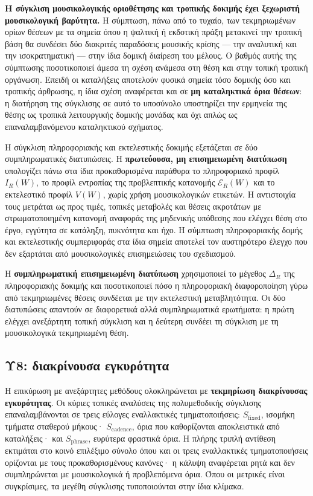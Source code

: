 \documentclass[11pt,a4paper]{article}
\begin{document}
\textbf{Η σύγκλιση μουσικολογικής οριοθέτησης και τροπικής δοκιμής έχει ξεχωριστή μουσικολογική βαρύτητα.} Η σύμπτωση, πάνω από το τυχαίο, των τεκμηριωμένων ορίων θέσεων με τα σημεία όπου η ψαλτική ή εκδοτική πράξη μετακινεί την τροπική βάση θα συνδέσει δύο διακριτές παραδόσεις μουσικής κρίσης --- την αναλυτική και την ισοκρατηματική --- στην ίδια δομική διαίρεση του μέλους. Ο βαθμός αυτής της σύμπτωσης ποσοτικοποιεί άμεσα τη σχέση ανάμεσα στη θέση και στην τοπική τροπική οργάνωση. Επειδή οι καταλήξεις αποτελούν φυσικά σημεία τόσο δομικής όσο και τροπικής άρθρωσης, η ίδια σχέση αναφέρεται και σε \textbf{μη καταληκτικά όρια θέσεων}: η διατήρηση της σύγκλισης σε αυτό το υποσύνολο υποστηρίζει την ερμηνεία της θέσης ως τροπικά λειτουργικής δομικής μονάδας και όχι απλώς ως επαναλαμβανόμενου καταληκτικού σχήματος.

Η σύγκλιση πληροφοριακής και εκτελεστικής δοκιμής εξετάζεται σε δύο συμπληρωματικές διατυπώσεις. Η \textbf{πρωτεύουσα, μη επισημειωμένη διατύπωση} υπολογίζει πάνω στα ίδια προκαθορισμένα παράθυρα το πληροφοριακό προφίλ \(I_R(W)\), το προφίλ εντροπίας της προβλεπτικής κατανομής \(\mathcal E_R(W)\) και το εκτελεστικό προφίλ \(V(W)\), χωρίς χρήση μουσικολογικών ετικετών. Η αντιστοιχία τους μετράται ως προς τιμές, τοπικές μεταβολές και θέσεις ακροτάτων με στρωματοποιημένη κατανομή αναφοράς της μηδενικής υπόθεσης που ελέγχει θέση στο έργο, εγγύτητα σε κατάληξη, πυκνότητα και ήχο. Η σύμπτωση πληροφοριακής δομής και εκτελεστικής συμπεριφοράς στα ίδια σημεία αποτελεί τον αυστηρότερο έλεγχο που δεν εξαρτάται από μουσικολογικές επισημειώσεις του σχεδιασμού.

Η \textbf{συμπληρωματική επισημειωμένη διατύπωση} χρησιμοποιεί το μέγεθος \(\Delta_R\) της πληροφοριακής δοκιμής και ποσοτικοποιεί πόσο η πληροφοριακή διαφοροποίηση γύρω από τεκμηριωμένες θέσεις συνδέεται με την εκτελεστική μεταβλητότητα. Οι δύο διατυπώσεις απαντούν σε διαφορετικά αλλά συμπληρωματικά ερωτήματα: η πρώτη ελέγχει ανεξάρτητη τοπική σύγκλιση και η δεύτερη συνδέει τη σύγκλιση με τη μουσικολογικά τεκμηριωμένη θέση.

\subsection{Υ8: διακρίνουσα εγκυρότητα}\label{app:stats-disc}

Η επικύρωση με ανεξάρτητες μεθόδους ολοκληρώνεται με \textbf{τεκμηρίωση διακρίνουσας εγκυρότητας}. Οι κύριες τοπικές αναλύσεις της πολυμεθοδικής σύγκλισης επαναλαμβάνονται σε τρεις εύλογες εναλλακτικές τμηματοποιήσεις: \(S_{\mathrm{fixed}}\), ισομήκη τμήματα σταθερού μήκους· \(S_{\mathrm{cadence}}\), όρια που καθορίζονται αποκλειστικά από καταλήξεις· και \(S_{\mathrm{phrase}}\), ευρύτερα φραστικά όρια. Η πλήρης τριπλή αντίθεση εκτιμάται στο κοινό επιλέξιμο σύνολο όπου και οι τρεις εναλλακτικές τμηματοποιήσεις ορίζονται με τους προκαθορισμένους κανόνες· η κάλυψη αναφέρεται ρητά και δεν συμπληρώνεται με μουσικολογικά ή προβλεπόμενα όρια. Όπου οι μετρικές είναι συγκρίσιμες, τα μεγέθη σύγκλισης τυποποιούνται στην ίδια κλίμακα.
\end{document}
